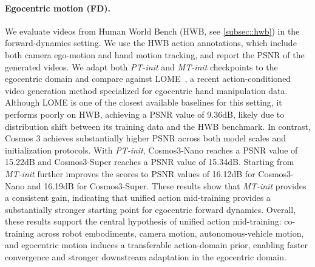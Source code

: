 

\paragraph{Egocentric motion (FD).}
\label{sec:egocentric_fdm}
We evaluate videos from Human World Bench (HWB, see \cref{subsec::hwb}) in the forward-dynamics
setting. We use the HWB action annotations, which include both camera ego-motion and hand motion tracking, and report the PSNR of the generated
videos. We adapt both \textit{PT-init} and \textit{MT-init} checkpoints to the egocentric domain and compare against LOME~\citep{gao2026lome}, a recent action-conditioned video generation method specialized for egocentric hand manipulation data. 
Although LOME is one of the closest available baselines for this setting, it performs poorly on HWB, achieving a PSNR value of 9.36dB, likely due to distribution shift between its training data and the HWB benchmark.
In contrast, Cosmos 3 achieves substantially higher PSNR across both model scales and initialization protocols. With \textit{PT-init},
Cosmos3-Nano reaches a PSNR value of 15.22dB and Cosmos3-Super reaches a PSNR value of 15.34dB. 
Starting from \textit{MT-init}
further improves the scores to PSNR values of 16.12dB for Cosmos3-Nano and 16.19dB for Cosmos3-Super. 
These results show that \textit{MT-init} provides a consistent gain, indicating that unified action mid-training
provides a substantially stronger starting point for egocentric forward dynamics.
Overall, these results support the central hypothesis of unified action mid-training: co-training across robot embodiments, camera
motion, autonomous-vehicle motion, and egocentric motion induces a transferable action-domain prior, enabling faster convergence and
stronger downstream adaptation in the egocentric domain.

